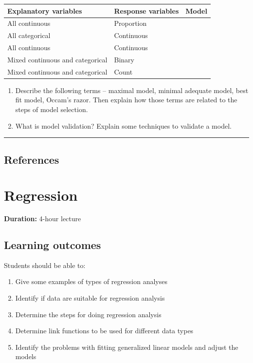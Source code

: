 \documentclass[
]{book}
\newcounter{none} %
\providecommand{\tightlist}{%
  \setlength{\itemsep}{0pt}\setlength{\parskip}{0pt}}
\begin{document}
{\def\LTcaptype{none} %
\begin{longtable}[]{@{}lll@{}}
\toprule\noalign{}
Explanatory variables & Response variables & Model \\
\midrule\noalign{}
\endhead
\bottomrule\noalign{}
\endlastfoot
All continuous & Proportion & \\
All categorical & Continuous & \\
All continuous & Continuous & \\
Mixed continuous and categorical & Binary & \\
Mixed continuous and categorical & Count & \\
\end{longtable}
}

\begin{enumerate}
\def\labelenumi{\arabic{enumi}.}
\setcounter{enumi}{1}
\item
  Describe the following terms -- maximal model, minimal adequate model, best fit model, Occam's razor. Then explain how those terms are related to the steps of model selection.
\item
  What is model validation? Explain some techniques to validate a model.
\end{enumerate}

\begin{center}\rule{0.5\linewidth}{0.5pt}\end{center}

\section{References}\label{references-8}

\chapter{Regression}\label{regression}

\textbf{Duration:} 4-hour lecture

\section{Learning outcomes}\label{learning-outcomes-9}

Students should be able to:

\begin{enumerate}
\def\labelenumi{\arabic{enumi}.}
\tightlist
\item
  Give some examples of types of regression analyses
\item
  Identify if data are suitable for regression analysis
\item
  Determine the steps for doing regression analysis
\item
  Determine link functions to be used for different data types
\item
  Identify the problems with fitting generalized linear models and adjust the models
\end{enumerate}
\end{document}
